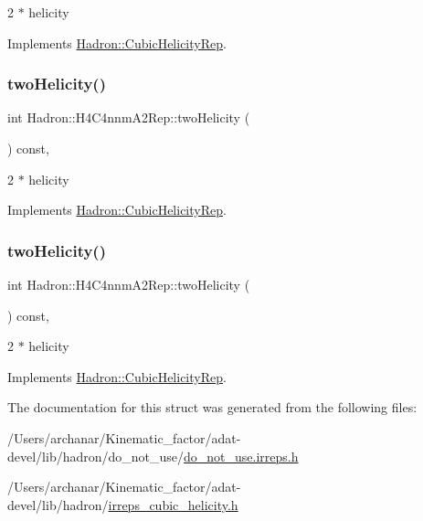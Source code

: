2 $\ast$ helicity 

Implements \mbox{\hyperlink{structHadron_1_1CubicHelicityRep_af507aa56fc2747eacc8cb6c96db31ecc}{Hadron\+::\+Cubic\+Helicity\+Rep}}.

\mbox{\label{structHadron_1_1H4C4nnmA2Rep_ab2b49f0e189eae4dc52cb9ab1d7f9b11}} 
\subsubsection{\texorpdfstring{twoHelicity()}{twoHelicity()}\hspace{0.1cm}{\footnotesize\ttfamily [2/3]}}
{\footnotesize\ttfamily int Hadron\+::\+H4\+C4nnm\+A2\+Rep\+::two\+Helicity (\begin{DoxyParamCaption}{ }\end{DoxyParamCaption}) const\hspace{0.3cm}{\ttfamily [inline]}, {\ttfamily [virtual]}}

2 $\ast$ helicity 

Implements \mbox{\hyperlink{structHadron_1_1CubicHelicityRep_af507aa56fc2747eacc8cb6c96db31ecc}{Hadron\+::\+Cubic\+Helicity\+Rep}}.

\mbox{\label{structHadron_1_1H4C4nnmA2Rep_ab2b49f0e189eae4dc52cb9ab1d7f9b11}} 
\subsubsection{\texorpdfstring{twoHelicity()}{twoHelicity()}\hspace{0.1cm}{\footnotesize\ttfamily [3/3]}}
{\footnotesize\ttfamily int Hadron\+::\+H4\+C4nnm\+A2\+Rep\+::two\+Helicity (\begin{DoxyParamCaption}{ }\end{DoxyParamCaption}) const\hspace{0.3cm}{\ttfamily [inline]}, {\ttfamily [virtual]}}

2 $\ast$ helicity 

Implements \mbox{\hyperlink{structHadron_1_1CubicHelicityRep_af507aa56fc2747eacc8cb6c96db31ecc}{Hadron\+::\+Cubic\+Helicity\+Rep}}.



The documentation for this struct was generated from the following files\+:\begin{DoxyCompactItemize}
\item 
/\+Users/archanar/\+Kinematic\+\_\+factor/adat-\/devel/lib/hadron/do\+\_\+not\+\_\+use/\mbox{\hyperlink{adat-devel_2lib_2hadron_2do__not__use_2do__not__use_8irreps_8h}{do\+\_\+not\+\_\+use.\+irreps.\+h}}\item 
/\+Users/archanar/\+Kinematic\+\_\+factor/adat-\/devel/lib/hadron/\mbox{\hyperlink{adat-devel_2lib_2hadron_2irreps__cubic__helicity_8h}{irreps\+\_\+cubic\+\_\+helicity.\+h}}\end{DoxyCompactItemize}
